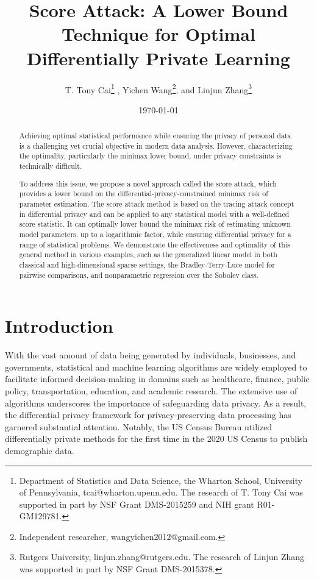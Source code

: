 \documentclass[letterpaper,12pt]{article}
\numberwithin{equation}{section}
\theoremstyle{plain}
\numberwithin{Theorem}{section}
\numberwithin{proposition}{section}
\numberwithin{Lemma}{section}
{
	\theoremstyle{definition}
	\newtheorem{Definition}{Definition}
	\newtheorem{example}{Example}
	\numberwithin{example}{section}
	\newtheorem{fact}{Fact}
	\numberwithin{fact}{section}
	\newtheorem{remark}{Remark}
}
\newcommand{\1}{\mathbbm{1}}
\begin{document}
	
	\title{Score Attack: A Lower Bound Technique for Optimal Differentially Private Learning}
	\author{T. Tony Cai\footnote{Department of Statistics and Data Science, the Wharton School, University of Pennsylvania,  tcai@wharton.upenn.edu. The research of T. Tony Cai was supported in part by NSF Grant DMS-2015259 and NIH grant R01-GM129781.} ,  Yichen Wang\footnote{Independent researcher, wangyichen2012@gmail.com.}, and  Linjun Zhang\footnote{Rutgers University, linjun.zhang@rutgers.edu. The research of Linjun Zhang was supported in part by NSF Grant DMS-2015378. }}

	\date{\today}
	
	\maketitle
	
\begin{abstract}
	Achieving optimal statistical performance while ensuring the privacy of personal data is a challenging yet crucial objective in modern data analysis. However, characterizing the optimality, particularly the minimax lower bound, under privacy constraints is technically difficult.
	
	To address this issue, we propose a novel approach called the score attack, which provides a lower bound on the differential-privacy-constrained minimax risk of parameter estimation. The score attack method is based on the tracing attack concept in differential privacy and can be applied to any statistical model with a well-defined score statistic. It can optimally lower bound the minimax risk of estimating unknown model parameters, up to a logarithmic factor, while ensuring differential privacy for a range of statistical problems. We demonstrate the effectiveness and optimality of this general method in various examples, such as the generalized linear model in both classical and high-dimensional sparse settings, the Bradley-Terry-Luce model for pairwise comparisons, and nonparametric regression over the Sobolev class.
\end{abstract}
	
  
\section{Introduction}
  
With the vast amount of data being generated by individuals, businesses, and governments, statistical and machine learning algorithms are widely employed to facilitate informed decision-making in domains such as healthcare, finance, public policy, transportation, education, and academic research. The extensive use of algorithms underscores the importance of safeguarding data privacy. As a result, the differential privacy framework \cite{dwork2006our, dwork2006calibrating} for privacy-preserving data processing has garnered substantial attention. Notably, the US Census Bureau utilized differentially private methods for the first time in the 2020 US Census \cite{hawes2020implementing} to publish demographic data.
\end{document}
